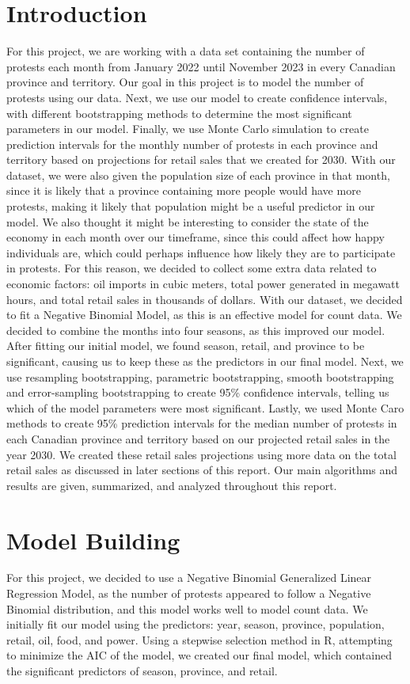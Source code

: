 \documentclass[12pt]{article}
\begin{document}
\section{Introduction}
For this project, we are working with a data set containing the number of protests each month from January 2022 until November 2023 in every Canadian province and territory. Our goal in this project is to model the number of protests using our data. Next, we use our model to create confidence intervals, with different bootstrapping methods to determine the most significant parameters in our model.  Finally, we use Monte Carlo simulation to create prediction intervals for the monthly number of protests in each province and territory based on projections for retail sales that we created for 2030.
With our dataset, we were also given the population size of each province in that month, since it is likely that a province containing more people would have more protests, making it likely that population might be a useful predictor in our model. We also thought it might be interesting to consider the state of the economy in each month over our timeframe, since this could affect how happy individuals are, which could perhaps influence how likely they are to participate in protests. For this reason, we decided to collect some extra data related to economic factors: oil imports in cubic meters, total power generated in megawatt hours, and total retail sales in thousands of dollars.
With our dataset, we decided to fit a Negative Binomial Model, as this is an effective model for count data. We decided to combine the months into four seasons, as this improved our model. After fitting our initial model, we found season, retail, and province to be significant, causing us to keep these as the predictors in our final model. Next, we use resampling bootstrapping, parametric bootstrapping, smooth bootstrapping and error-sampling bootstrapping to create 95\% confidence intervals, telling us which of the model parameters were most significant. Lastly, we used Monte Caro methods to create 95\% prediction intervals for the median number of protests in each Canadian province and territory based on our projected retail sales in the year 2030. We created these retail sales projections using more data on the total retail sales as discussed in later sections of this report.
Our main algorithms and results are given, summarized, and analyzed throughout this report.

\newpage
\section{Model Building}
For this project, we decided to use a Negative Binomial Generalized Linear Regression Model, as the number of protests appeared to follow a Negative Binomial distribution, and this model works well to model count data. We initially fit our model using the predictors: year, season, province, population, retail, oil, food, and power. Using a stepwise selection method in R, attempting to minimize the AIC of the model, we created our final model, which contained the significant predictors of season, province, and retail.
\end{document}
